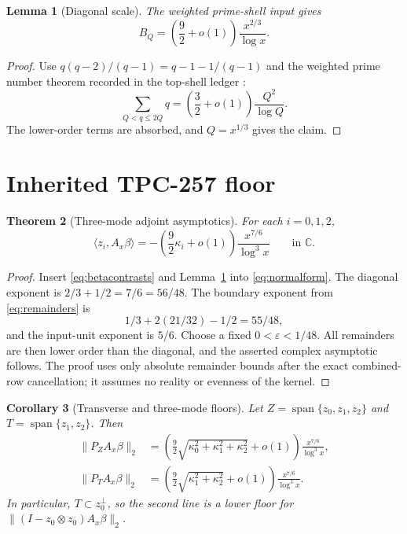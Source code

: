 \documentclass[10pt]{article}
\newtheorem{theorem}{Theorem}
\newtheorem{lemma}[theorem]{Lemma}
\newtheorem{corollary}[theorem]{Corollary}
\newcommand{\C}{\mathbb C}
\newcommand{\ip}[2]{\langle #1,#2\rangle}
\newcommand{\Ax}{A_x}
\newcommand{\e}{\varepsilon}
\begin{document}
\begin{lemma}[Diagonal scale]\label{lem:bq}
The weighted prime-shell input gives
\[
 B_Q=\left(\frac92+o(1)\right)\frac{x^{2/3}}{\log x}.
\]
\end{lemma}

\begin{proof}
Use \(q(q-2)/(q-1)=q-1-1/(q-1)\) and the weighted prime number theorem
recorded in the top-shell ledger \cite{v59}:
\[
 \sum_{Q<q\leq2Q}q=\left(\frac32+o(1)\right)\frac{Q^2}{\log Q}.
\]
The lower-order terms are absorbed, and \(Q=x^{1/3}\) gives the claim.
\end{proof}

\section{Inherited TPC-257 floor}

\begin{theorem}[Three-mode adjoint asymptotics]\label{thm:main}
For each \(i=0,1,2\),
\begin{equation}
 \boxed{\displaystyle
 \ip{z_i}{\Ax\beta}
 =-\left(\frac92\kappa_i+o(1)\right)
   \frac{x^{7/6}}{\log^3x}}\qquad\text{in }\C.              \label{eq:scalar}
\end{equation}
\end{theorem}

\begin{proof}
Insert \eqref{eq:betacontrasts} and Lemma~\ref{lem:bq} into
\eqref{eq:normalform}.  The diagonal exponent is
\(2/3+1/2=7/6=56/48\).  The boundary exponent from \eqref{eq:remainders} is
\[
 1/3+2(21/32)-1/2=55/48,
\]
and the input-unit exponent is \(5/6\).  Choose a fixed
\(0<\e<1/48\).  All remainders are then lower order than the diagonal, and
the asserted complex asymptotic follows.  The proof uses only absolute
remainder bounds after the exact combined-row cancellation; it assumes no
reality or evenness of the kernel.
\end{proof}

\begin{corollary}[Transverse and three-mode floors]\label{cor:floors}
Let \(Z=\operatorname{span}\{z_0,z_1,z_2\}\) and
\(T=\operatorname{span}\{z_1,z_2\}\).  Then
\begin{align}
 \|P_Z\Ax\beta\|_2
 &=\left(\frac92\sqrt{\kappa_0^2+\kappa_1^2+\kappa_2^2}+o(1)\right)
   \frac{x^{7/6}}{\log^3x},                              \label{eq:zfloor}\\
 \|P_T\Ax\beta\|_2
 &=\left(\frac92\sqrt{\kappa_1^2+\kappa_2^2}+o(1)\right)
   \frac{x^{7/6}}{\log^3x}.                              \label{eq:tfloor}
\end{align}
In particular, \(T\subset z_0^\perp\), so the second line is a lower floor
for \(\|(I-z_0\otimes z_0)\Ax\beta\|_2\).
\end{corollary}
\end{document}

